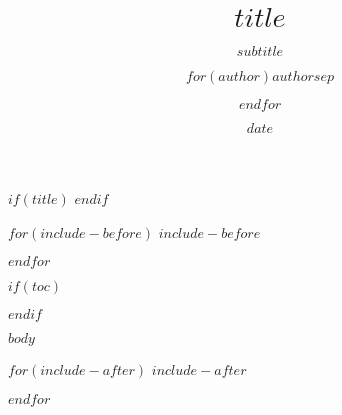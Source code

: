 \documentclass[aspectratio=169,12pt]{beamer}
\title{$title$}
\subtitle{$subtitle$}
\author{$for(author)$$author$$sep$ \and $endfor$}
\institute{\texttt{[image: img/logo\_blue.pdf]}}
\date{$date$}
\begin{document}
$if(title)$
\frame{\titlepage}
$endif$

$for(include-before)$
$include-before$

$endfor$

$if(toc)$
\begin{frame}
\tableofcontents[hideallsubsections]
\end{frame}

$endif$

$body$

$for(include-after)$
$include-after$

$endfor$
\end{document}
